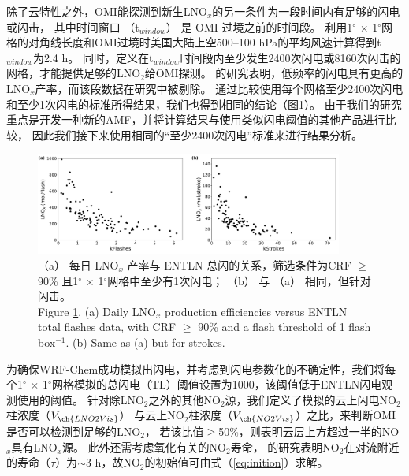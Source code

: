 除了云特性之外，OMI能探测到新生LNO$_x$的另一条件为一段时间内有足够的闪电或闪击，
其中时间窗口 （t$_{window}$） 是 OMI 过境之前的时间段。
\citet{Lapierre.2020}利用1$^{\circ}$ $\times$ 1$^{\circ}$网格的对角线长度和OMI过境时美国大陆上空500--100 hPa的平均风速计算得到t$_{window}$为2.4 h。
同时，\citet{Lapierre.2020}定义在t$_{window}$时间段内至少发生2400次闪电或8160次闪击的网格，才能提供足够的LNO$_2$给OMI探测。
\citet{Bucsela.2019}的研究表明，低频率的闪电具有更高的LNO$_x$产率，而该段数据在\citet{Lapierre.2020}研究中被剔除。
通过比较使用每个网格至少2400次闪电和至少1次闪电的标准所得结果，我们也得到相同的结论（图\ref{fig:us_flash_threshold}）。
由于我们的研究重点是开发一种新的AMF，并将计算结果与使用类似闪电阈值的其他产品进行比较\citep{Pickering.2016,Lapierre.2020}，
因此我们接下来使用相同的“至少2400次闪电”标准来进行结果分析。


\begin{figure}[H]
\centering
\includegraphics[width=0.9\textwidth]{./figures/us_flash_threshold.png}
\caption{
（a） 每日 LNO$_x$ 产率与 ENTLN 总闪的关系，筛选条件为CRF $\geq$ 90\% 且1$^{\circ}$ $\times$ 1$^{\circ}$网格中至少有1次闪电；
 （b） 与 （a） 相同，但针对闪击。\\
Figure \ref{fig:us_flash_threshold}. (a) Daily LNO$_x$ production efficiencies versus ENTLN total flashes data, with CRF $\geq$ 90\% and a flash threshold of 1 flash box$^{-1}$.
(b) Same as (a) but for strokes.}
\label{fig:us_flash_threshold}
\end{figure}


为确保WRF-Chem成功模拟出闪电，并考虑到闪电参数化的不确定性，我们将每个1$^{\circ}$ $\times$ 1$^{\circ}$网格模拟的总闪电（TL）阈值设置为1000，该阈值低于ENTLN闪电观测使用的阈值。
针对除LNO$_2$之外的其他NO$_2$源，我们定义了模拟的云上闪电NO$_2$柱浓度（$V_{\ch{LNO2Vis}}$）
与云上NO$_2$柱浓度（$V_{\ch{NO2Vis}}$）之比，来判断OMI是否可以检测到足够的LNO$_2$，
若该比值$\geq$50\%，则表明云层上方超过一半的NO$_x$具有LNO$_x$源。
此外还需考虑氧化有关的NO$_2$寿命，
\citet{Nault.2017}的研究表明NO$_2$在对流附近的寿命（$\tau$）为$\sim$3 h，故NO$_2$的初始值可由式（\ref{eq:inition}）求解。

